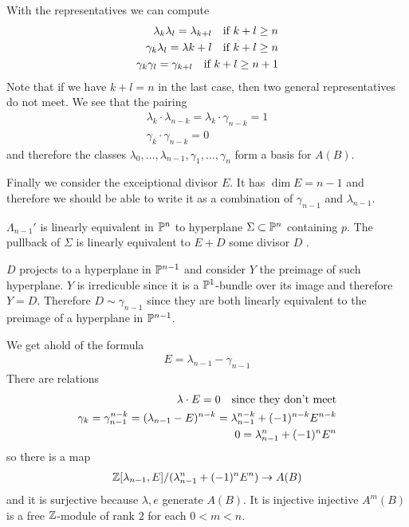 \documentclass[12pt]{article}
\begin{document}
\begin{example}
    \hfill

    With the representatives we can compute \begin{align*}
        \lambda_k\lambda_l = \lambda_{k+l} \texty {if $k+l\geq n$} \\
        \gamma_k\lambda_l = \lambda{k+l} \texty {if $k+l\geq n$} \\
        \gamma_k\gamma_l = \gamma_{k+l} \texty {if $k+l\geq n+1$}
    \end{align*} Note that if we have $k+l = n$ in the last case, then two general representatives
    do not meet. 
    We see that the pairing \begin{align*}
        \lambda_k \cdot \lambda_{n-k} = \lambda_k \cdot \gamma_{n-k} = 1 \\
        \gamma_k \cdot \gamma_{n-k} = 0
    \end{align*} and therefore the classes $\lambda_0,\dots, \lambda_{n-1},\gamma_1,\dots,\gamma_n$ form a basis for $A(B)$.

    \hfill

    Finally we consider the exceiptional divisor $E$. It has $\dim E = n-1$ and therefore
    we should be able to write it as a combination of $\gamma_{n-1}$ and $\lambda_{n-1}$. 

    \hfill

    $\Lambda_{n-1}'$ is linearly equivalent in $\P^n$ to hyperplane $\Sigma \subset \P^n$
    containing $p$. The pullback of $\Sigma$ is linearly equivalent to $E + D$ some divisor $D$ 
    .

    \hfill

    $D$ projects to a hyperplane in $\P^{n-1}$ and consider $Y$ the preimage of such hyperplane. $Y$ 
    is irredicuble since it is a $\P^1$-bundle over its image and therefore $Y=D$. Therefore $D \sim \gamma_{n-1}$ 
    since they are both linearly equivalent to the preimage of a hyperplane in $\P^{n-1}$.

    \hfill

    We get ahold of the formula \begin{align*}
        E = \lambda_{n-1} - \gamma_{n-1}
    \end{align*} There are relations \begin{align}
        \lambda \cdot E = 0 \texty {since they don't meet} \\
        \gamma_k = \gamma^{n-k}_{n-1} = (\lambda_{n-1} - E)^{n-k} = \lambda_{n-1}^{n-k} + (-1)^{n-k}E^{n-k} \\
        0 = \lambda_{n-1}^n + (-1)^nE^n
    \end{align}
    so there is a map \begin{align*}
        \Z[\lambda_{n-1},E]/(\lambda_{n-1}^n + (-1)^nE^n) \to A(B)
    \end{align*} and it is surjective because $\lambda,e$ generate $A(B)$.
    It is injective injective $A^m(B)$ is a free $\Z$-module of rank $2$ for each $0<m<n$.


\end{example}
\end{document}
